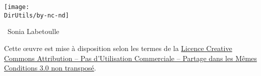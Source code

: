 \noi\texttt{[image: \\DirUtils/by-nc-nd]}

\noi\textcopyright~Sonia Labetoulle

\noi Cette \oe{}uvre est mise à disposition selon les termes de la 
\href{http://creativecommons.org/licenses/by-nc-sa/3.0/}{Licence 
Creative Commons Attribution -- Pas d’Utilisation Commerciale -- 
Partage dans les Mêmes Conditions 3.0 non transposé}.
